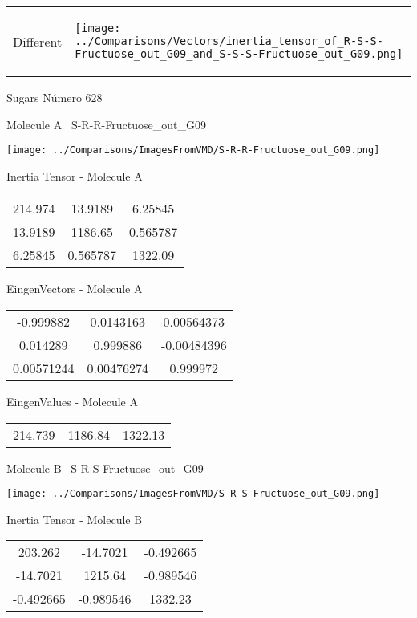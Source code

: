 \vtab[-5mm]
\begin{tabular}{*{2}{m{}}}
\begin{center}
\textcolor{NavyBlue}{\Large Different}
\end{center}
&
\begin{center}
\texttt{[image: ../Comparisons/Vectors/inertia\_tensor\_of\_R-S-S-Fructuose\_out\_G09\_and\_S-S-S-Fructuose\_out\_G09.png]}
\end{center}
\end{tabular}

 \newpage

\vtab[-3cm]
\begin{center}
{\large Sugars \tab Número 628}
\end{center}
\begin{multicols}{2}
\begin{center}

Molecule A \
S-R-R-Fructuose\_out\_G09

\texttt{[image: ../Comparisons/ImagesFromVMD/S-R-R-Fructuose\_out\_G09.png]}

Inertia Tensor - Molecule A \\
\begin{tabular}{|c c c|}
214.974	 & 	13.9189	 & 	6.25845	 \\
13.9189	 & 	1186.65	 & 	0.565787	 \\
6.25845	 & 	0.565787	 & 	1322.09
\end{tabular}

\vtab
 EingenVectors - Molecule A     \\
\begin{tabular}{|c c c|}
-0.999882	 & 	0.0143163	 & 	0.00564373	 \\
0.014289	 & 	0.999886	 & 	-0.00484396	 \\
0.00571244	 & 	0.00476274	 & 	0.999972
\end{tabular}

\vtab
 EingenValues - Molecule A     \\
\begin{tabular}{|c c c|}
214.739	 & 	1186.84	 & 	1322.13	 \\
\end{tabular}
\columnbreak

Molecule B \
S-R-S-Fructuose\_out\_G09

\texttt{[image: ../Comparisons/ImagesFromVMD/S-R-S-Fructuose\_out\_G09.png]}

Inertia Tensor - Molecule B \\
\begin{tabular}{|c c c|}
203.262	 & 	-14.7021	 & 	-0.492665	 \\
-14.7021	 & 	1215.64	 & 	-0.989546	 \\
-0.492665	 & 	-0.989546	 & 	1332.23
\end{tabular}


\end{center}
\end{multicols}
